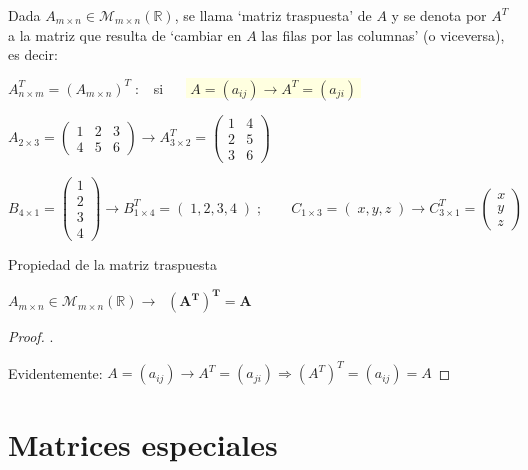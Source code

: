 \begin{defi} Dada $A_{m\times n}\in \mathcal M_{m\times n}(\mathbb R)$, se llama `matriz traspuesta' de $A$ y se denota por $A^T$ a la matriz que resulta de `cambiar en $A$ las filas por las columnas' (o viceversa), es decir:

$A^T_{n\times m} = (A_{m\times n})^T\; :\;  \; $ si  $\quad$ \colorbox{LightYellow}{$\boxed{ \; A=(a_{ij}) \to A^T=(a_{ji})\; }$	}
\end{defi}

\begin{ejem}
$A_{2\times 3}=\left( \begin{matrix} 1 & 2 & 3 \\ 4 & 5 & 6 \end{matrix} \right)	 \to A^T_{3\times 2}= \left( \begin{matrix} 1 & 4 \\ 2 & 5 \\ 3 & 6 \end{matrix} \right)	 $

\noindent \small{$B_{4\times 1}=\left( \begin{matrix} 1 \\ 2 \\ 3 \\ 4 \end{matrix} \right) \to B^T_{1\times 4}= (\;1,2,3,4 \; ) \; ; \qquad C_{1\times 3}= (\;x,y,z \;) \to C^T_{3\times 1}=\left( \begin{matrix} x \\ y \\ z \end{matrix} \right)$}
\end{ejem}

\begin{prop}{Propiedad de la matriz traspuesta}
\label{propo1}

$A_{m\times n}\in \mathcal M_{m\times n}(\mathbb R) \to\; \boxed{\; \boldsymbol{ (A^T)^T=A}\; } $ 	
\end{prop}

\begin{proof}.

Evidentemente: $A=(a_{ij}) \to A^T=(a_{ji}) \Rightarrow (A^T)^T=(a_{ij})=A$	
\end{proof}


\section{Matrices especiales}

